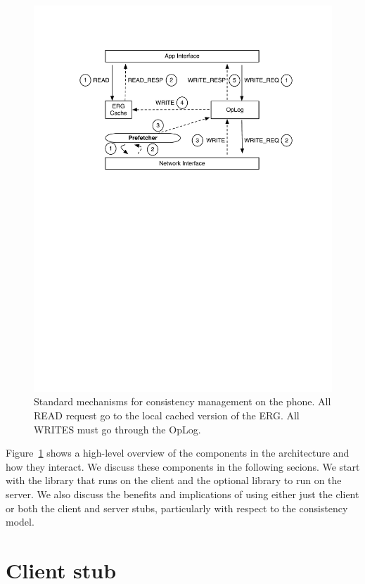 \begin{figure}[htb!]
\begin{center}
\includegraphics[scale=0.50]{figs/standard_interaction}
\caption{Standard mechanisms for consistency management on the phone.  All READ request go to the local
cached version of the ERG.  All WRITES must go through the OpLog.}
\label{fig:basic_arch}
\end{center}
\end{figure}

Figure~\ref{fig:basic_arch} shows a high-level overview of the components in the architecture and how they interact.  We discuss 
these components in the following secions.  We start with the library that runs on the client and the optional library to run
on the server.  We also discuss the benefits and implications of using either just the client or both the client and server
stubs, particularly with respect to the consistency model.


\section{Client stub}

